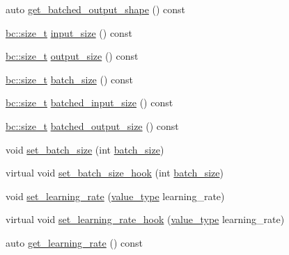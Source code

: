 \begin{DoxyCompactItemize}
\item 
auto \hyperlink{structbc_1_1nn_1_1Layer__Base_ac202a8a70bb824497ad2be74b959e2a7}{get\+\_\+batched\+\_\+output\+\_\+shape} () const
\item 
\hyperlink{namespacebc_aaf8e3fbf99b04b1b57c4f80c6f55d3c5}{bc\+::size\+\_\+t} \hyperlink{structbc_1_1nn_1_1Layer__Base_a215129f56ab675fb8249b82f8f859ac4}{input\+\_\+size} () const
\item 
\hyperlink{namespacebc_aaf8e3fbf99b04b1b57c4f80c6f55d3c5}{bc\+::size\+\_\+t} \hyperlink{structbc_1_1nn_1_1Layer__Base_a1f5d7b9b3096649c0f2149c5917aec16}{output\+\_\+size} () const
\item 
\hyperlink{namespacebc_aaf8e3fbf99b04b1b57c4f80c6f55d3c5}{bc\+::size\+\_\+t} \hyperlink{structbc_1_1nn_1_1Layer__Base_a2602afd12a449c9d1200254b9fce14f7}{batch\+\_\+size} () const
\item 
\hyperlink{namespacebc_aaf8e3fbf99b04b1b57c4f80c6f55d3c5}{bc\+::size\+\_\+t} \hyperlink{structbc_1_1nn_1_1Layer__Base_a8beff5b62d525ca28e67d0c852e8a341}{batched\+\_\+input\+\_\+size} () const
\item 
\hyperlink{namespacebc_aaf8e3fbf99b04b1b57c4f80c6f55d3c5}{bc\+::size\+\_\+t} \hyperlink{structbc_1_1nn_1_1Layer__Base_ac4e28faccc21e1d9510821bcde89ed42}{batched\+\_\+output\+\_\+size} () const
\item 
void \hyperlink{structbc_1_1nn_1_1Layer__Base_a5a58881f4a7ffd91afea404227c2673c}{set\+\_\+batch\+\_\+size} (int \hyperlink{structbc_1_1nn_1_1Layer__Base_a2602afd12a449c9d1200254b9fce14f7}{batch\+\_\+size})
\item 
virtual void \hyperlink{structbc_1_1nn_1_1Layer__Base_a8365fc3fc656aadeb0513d8e02b5fba0}{set\+\_\+batch\+\_\+size\+\_\+hook} (int \hyperlink{structbc_1_1nn_1_1Layer__Base_a2602afd12a449c9d1200254b9fce14f7}{batch\+\_\+size})
\item 
void \hyperlink{structbc_1_1nn_1_1Layer__Base_ae755158e9666fd592e1bdf419828ded1}{set\+\_\+learning\+\_\+rate} (\hyperlink{structbc_1_1nn_1_1Layer__Base_a64df0ea9c50a4d6dcf59483cc797c393}{value\+\_\+type} learning\+\_\+rate)
\item 
virtual void \hyperlink{structbc_1_1nn_1_1Layer__Base_a126da3cf45e1b4a24deeff82c93772ce}{set\+\_\+learning\+\_\+rate\+\_\+hook} (\hyperlink{structbc_1_1nn_1_1Layer__Base_a64df0ea9c50a4d6dcf59483cc797c393}{value\+\_\+type} learning\+\_\+rate)
\item 
auto \hyperlink{structbc_1_1nn_1_1Layer__Base_a50dc1d02ae682257012f1ad5633f7d48}{get\+\_\+learning\+\_\+rate} () const
\item 

\end{DoxyCompactItemize}
